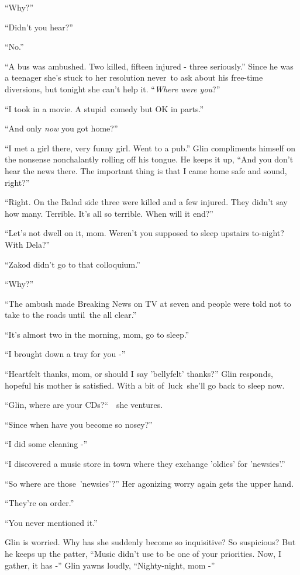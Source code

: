 \documentclass[twoside,11pt]{book}
\begin{document}
``Why?'' 

``Didn't you hear?'' 

``No.'' 

``A bus was ambushed. Two killed, fifteen injured - three seriously.'' Since he was a teenager
she's stuck to her resolution never{\ }to ask about his
free{{}-}time diversions, but tonight she can't help it.
``\textit{Where were you}?'' 

``I took in a movie. A stupid{\ }comedy but OK in
parts.'' 

``And only \textit{now} you got home?'' ~

``I met a girl there, very funny girl. Went to a pub.'' Glin compliments himself on the
nonsense nonchalantly rolling off his tongue. He keeps it up, ``And you don't hear the news there. The
important thing is that I came home safe and sound, right?'' 

``Right. On the Balad side three were killed and a few injured. They didn't say how many. Terrible. It's
all so terrible. When will it end?'' 

``Let's not dwell on it, mom. Weren't you supposed to sleep upstairs to-night? With Dela?'' 

``Zakod didn't go to that colloquium.'' 

``Why?'' 

``The ambush made Breaking News on TV at seven and people were told not to take to the roads until~the all
clear.'' 

``It's almost two in the morning, mom, go to sleep.'' 

``I brought down a tray for you -'' 

``Heartfelt thanks, mom, or should I say 'bellyfelt' thanks?'' Glin responds, hopeful his
mother is satisfied. With a bit of\ luck\ she'll go back to sleep now.

``Glin, where are your CDs?``\ \ she ventures.

``Since when have you become so nosey?'' 

``I did some cleaning -'' 

``I discovered a music store in town where they exchange {}'oldies{}' for {}'newsies{}'.'' 

``So where are those\ {}'newsies{}'?'' Her agonizing worry again gets the upper hand.

``They're on order.'' 

``You never mentioned it.'' 

Glin is worried. Why has she suddenly become so inquisitive? So suspicious? But he keeps up the patter,
``Music didn't use to be one of your priorities. Now, I gather, it has -'' Glin yawns
loudly{,} ``Nighty-night, mom -'' 
\end{document}
